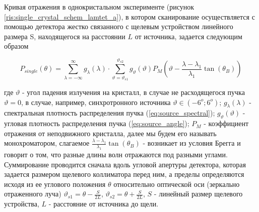 Кривая отражения в однокристальном эксперименте (рисунок \ref{ris:single_crystal_schem_lamtet_a}), в котором сканирование осуществляется
 с помощью детектора жестко связанного с щелевым устройством линейного размера S, находящегося на расстоянии $L$ от источника, задается следующим образом

\begin{equation} \label{eq:p_single_crystal}
  P_{single}(\theta) = \sum_{\lambda = -\infty}^{\infty}g_{\lambda}(\lambda) \cdot \sum_{\vartheta = \vartheta_{s1}}^{\vartheta_{s2}}
  g_{\vartheta}(\vartheta) P_M(\vartheta - \frac{\lambda - \lambda_1}{\lambda_1}\tan(\theta_B))
 \end{equation}

где $\vartheta$ - угол падения излучения на кристалл, в случае не расходящегося пучка $\vartheta = 0$, в
случае, например, синхротронного источника $\vartheta \in (-6^o; 6^o) $; $g_{\lambda}(\lambda)$
- спектральная плотность распределения пучка (\ref{eq:source_spectral}); $g_{\vartheta}(\vartheta)$ - угловая плотность
распределения пучка (\ref{eq:source_angle}); $P_M$ - коэффициент отражения от неподвижного кристалла, далее мы будем его называть монохроматором,
слагаемое $\frac{\lambda - \lambda_1}{\lambda_1}\tan(\theta_B)$ -
возникает из условия Брегга и говорит о том, что разные длины волн отражаются под разными углами.
 Суммирование проводится сначала вдоль угловой апертуры детектора, которая задается размером
 щелевого коллиматора перед ним, а пределы определяются исходя из ее углового положения $\theta$ относительно
 оптической оси (зеркально отраженного луча) $\vartheta_{s1} = \theta - \frac{S}{2L}$, $\vartheta_{s2} = \theta + \frac{S}{2L}$,
 $S $ - линейный размер щелевого устройства, $L$ - расстояние от источника до щели.

